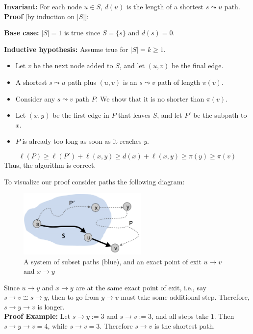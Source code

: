 \begin{Proof}

    \textbf{Invariant:} For each node $u \in S$, $d(u)$ is the length of a shortest $s \leadsto u$ path.\\
    \textbf{Proof} [by induction on $|S|$]:
    
    \textbf{Base case:} $|S| = 1$ is true since $S = \{s\}$ and $d(s) = 0$.
    
    \textbf{Inductive hypothesis:} Assume true for $|S| = k \geq 1$.
    \begin{itemize}
        \item Let $v$ be the next node added to $S$, and let $(u, v)$ be the final edge.
        \item A shortest $s \leadsto u$ path plus $(u, v)$ is an $s \leadsto v$ path of length $\pi(v)$.
        \item Consider any $s \leadsto v$ path $P$. We show that it is no shorter than $\pi(v)$.
        \item Let $(x, y)$ be the first edge in $P$ that leaves $S$, and let $P'$ be the subpath to $x$.
        \item $P$ is already too long as soon as it reaches $y$.
    \end{itemize}
    \[
    \ell(P) \geq \ell(P') + \ell(x, y) \geq d(x) + \ell(x, y) \geq \pi(y) \geq \pi(v)
    \]
    \noindent
    Thus, the algorithm is correct.
    \end{Proof}
    
\newpage

\noindent
To visualize our proof consider paths the following diagram:
\begin{figure}[h]
    \begin{center}
      \includegraphics[height=1.3in]{./Sections/dstra/dstra_proof.png}
    \end{center}
     \caption{A system of subset paths (blue), and an exact point of exit $u\to v$ and $x\to y$}\label{fig:dstra_proof}
\end{figure}

\noindent
Since $u\to y$ and $x\to y$ are at the same exact point of exit, i.e., say $s\to v\cong s\to y$, then to go from $y\to v$ must take some additional step.
Therefore, $s\to y\to v$ is longer.\\
\textbf{Proof Example:} Let $s\to y:= 3$ and $s\to v:= 3$, and all steps take $1$.
Then $s\to y\to v = 4$, while $s\to v = 3$. Therefore $s\to v$ is the shortest path.

